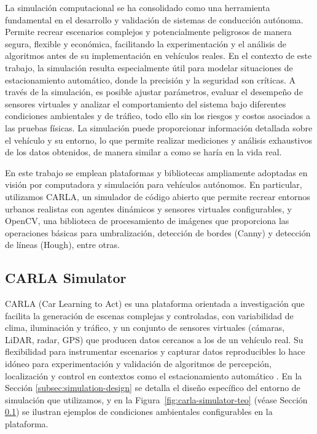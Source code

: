 
La simulación computacional se ha consolidado como una herramienta fundamental
en el desarrollo y validación de sistemas de conducción autónoma.
Permite recrear escenarios complejos y potencialmente peligrosos de manera segura,
flexible y económica, facilitando la experimentación y el análisis de algoritmos
antes de su implementación en vehículos reales. En el contexto de este trabajo,
la simulación resulta especialmente útil para modelar situaciones de estacionamiento
automático, donde la precisión y la seguridad son críticas. A través de la simulación,
es posible ajustar parámetros, evaluar el desempeño de sensores virtuales y analizar el
comportamiento del sistema bajo diferentes condiciones ambientales y de tráfico,
todo ello sin los riesgos y costos asociados a las pruebas físicas.
La simulación puede proporcionar información detallada sobre el vehículo y
su entorno, lo que permite realizar mediciones y análisis exhaustivos de los
datos obtenidos, de manera similar a como se haría en la vida real.

En este trabajo se emplean plataformas y bibliotecas ampliamente adoptadas en visión
por computadora y simulación para vehículos autónomos.
En particular, utilizamos CARLA, un simulador de código abierto que permite recrear entornos urbanos realistas
con agentes dinámicos y sensores virtuales configurables, y OpenCV, una biblioteca de procesamiento
de imágenes que proporciona las operaciones básicas para umbralización, detección de bordes (Canny)
y detección de líneas (Hough), entre otras.

\subsection{CARLA Simulator}\label{sec:carla-teorico}

CARLA (Car Learning to Act) es una plataforma orientada a investigación que facilita la generación de escenas
complejas y controladas, con variabilidad de clima, iluminación y tráfico, y un conjunto de sensores virtuales
(cámaras, LiDAR, radar, GPS) que producen datos cercanos a los de un vehículo real.
Su flexibilidad para instrumentar escenarios y capturar datos reproducibles lo hace idóneo para
experimentación y validación de algoritmos de percepción, localización y control en contextos como el
estacionamiento automático \cite{dosovitskiy2017carla}.
En la Sección \ref{subsec:simulation-design} se detalla el diseño específico del entorno de simulación que
utilizamos, y en la Figura~\ref{fig:carla-simulator-teo} (véase Sección \ref{sec:carla-teorico}) se ilustran ejemplos
de condiciones ambientales configurables en la plataforma.

